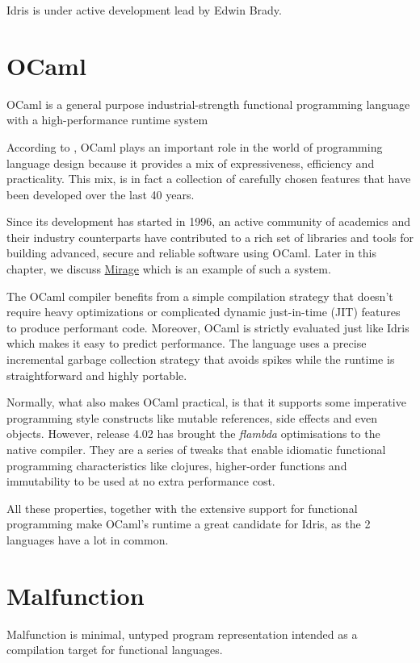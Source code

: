 Idris is under active development lead by Edwin Brady.

\section{OCaml}
OCaml is a general purpose industrial-strength functional
programming language with a high-performance runtime system

According to \citep{rwocaml}, OCaml plays an important role in the
world of programming language design because it provides a mix
of expressiveness, efficiency and practicality.
This mix, is in fact a collection of carefully chosen features
that have been developed over the last 40 years.

Since its development has started in 1996, an active community of
academics and their industry counterparts have contributed to a rich set of
libraries and tools for building advanced, secure and reliable software
using OCaml.
Later in this chapter, we discuss \hyperref[sec:mirage]{Mirage} which is
an example of such a system.

The OCaml compiler benefits from a simple
compilation strategy that doesn't require heavy optimizations or
complicated dynamic just-in-time (JIT) features to produce performant
code. Moreover, OCaml is strictly evaluated just like Idris which
makes it easy to predict performance.
The language uses  a precise incremental garbage collection strategy
that avoids spikes while the runtime is straightforward and highly
portable.

Normally, what also makes OCaml practical, is that it supports some
imperative programming style constructs like mutable references,
side effects and even objects.
However, release 4.02 has brought the \emph{flambda} optimisations to the
native compiler. They are a series of tweaks
that enable idiomatic functional programming characteristics like clojures,
higher-order functions and immutability to be used at no extra
performance cost.\citep{leroy2014ocaml}

All these properties, together with the extensive support
for functional programming make OCaml's runtime a great
candidate for Idris, as the 2 languages have a lot in common.

\section{Malfunction}
Malfunction is minimal, untyped program representation intended as a
compilation target for functional languages.

